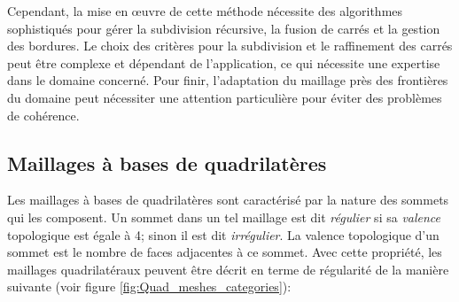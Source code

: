 Cependant, la mise en œuvre de cette méthode nécessite des algorithmes sophistiqués pour gérer la subdivision récursive, la fusion de carrés et la gestion des bordures. Le choix des critères pour la subdivision et le raffinement des carrés peut être complexe et dépendant de l'application, ce qui nécessite une expertise dans le domaine concerné. Pour finir, l'adaptation du maillage près des frontières du domaine peut nécessiter une attention particulière pour éviter des problèmes de cohérence.


\subsection{Maillages à bases de quadrilatères}

Les maillages à bases de quadrilatères sont caractérisé par la nature des sommets qui les composent. Un sommet dans un tel maillage est dit \emph{régulier} si sa \emph{valence} topologique est égale à 4; sinon il est dit \emph{irrégulier}. La valence topologique d'un sommet est le nombre de faces adjacentes à ce sommet. Avec cette propriété, les maillages quadrilatéraux peuvent être décrit en terme de régularité de la manière suivante \cite{bommes2013quad} (voir figure \ref{fig:Quad_meshes_categories}):\\


